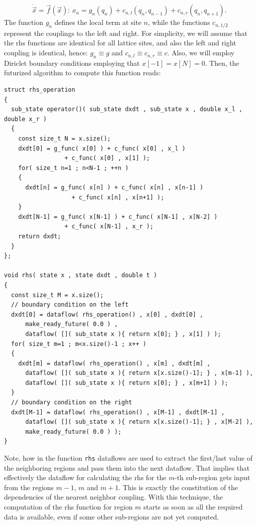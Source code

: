 \documentclass[a4wide,10pt]{scrartcl}
\begin{document}
\begin{equation}
 \dot{\vec x} = \vec f(\vec x):\, x_n = g_n(q_n) + c_{n,l}(q_{n},q_{n-1}) + c_{n,r}(q_{n},q_{n+1}).
\end{equation} 
The function $g_n$ defines the local term at site $n$, while the functions $c_{n,1/2}$ represent the couplings to the left and right.
For simplicity, we will assume that the rhs functions are identical for all lattice sites, and also the left and right coupling is identical, hence: $g_n \equiv g$ and $c_{n,l} \equiv c_{n,r} \equiv c$.
Also, we will employ Diriclet boundary conditions employing that $x[-1] = x[N] = 0$.
Then, the futurized algorithm to compute this function reads:
\begin{lstlisting}
struct rhs_operation
{
  sub_state operator()( sub_state dxdt , sub_state x , double x_l , double x_r )
  {
    const size_t N = x.size();
    dxdt[0] = g_func( x[0] ) + c_func( x[0] , x_l ) 
			     + c_func( x[0] , x[1] );
    for( size_t n=1 ; n<N-1 ; ++n )
    {
      dxdt[n] = g_func( x[n] ) + c_func( x[n] , x[n-1] ) 
			       + c_func( x[n] , x[n+1] );
    }
    dxdt[N-1] = g_func( x[N-1] ) + c_func( x[N-1] , x[N-2] ) 
				 + c_func( x[N-1] , x_r );
    return dxdt;
  }
};

void rhs( state x , state dxdt , double t )
{
  const size_t M = x.size();
  // boundary condition on the left
  dxdt[0] = dataflow( rhs_operation() , x[0] , dxdt[0] , 
      make_ready_future( 0.0 ) ,
      dataflow( []( sub_state x ){ return x[0]; } , x[1] ) );
  for( size_t m=1 ; m<x.size()-1 ; x++ )
  {
    dxdt[m] = dataflow( rhs_operation() , x[m] , dxdt[m] , 
      dataflow( []( sub_state x ){ return x[x.size()-1]; } , x[m-1] ),
      dataflow( []( sub_state x ){ return x[0]; } , x[m+1] ) );
  }
  // boundary condition on the right
  dxdt[M-1] = dataflow( rhs_operation() , x[M-1] , dxdt[M-1] , 
      dataflow( []( sub_state x ){ return x[x.size()-1]; } , x[M-2] ),
      make_ready_future( 0.0 ) );
}
\end{lstlisting}
Note, how in the function \lstinline+rhs+ dataflows are used to extract the first/last value of the neighboring regions and pass them into the next dataflow.
That implies that effectively the dataflow for calculating the rhs for the $m$-th sub-region gets input from the regions $m-1$, $m$ and $m+1$.
This is exactly the constitution of the dependencies of the nearest neighbor coupling.
With this technique, the computation of the rhs function for region $m$ starts as soon as all the required data is available, even if some other sub-regions are not yet computed.
\end{document}
